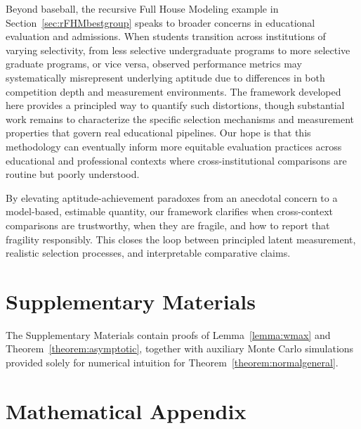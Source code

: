 \documentclass[12pt]{article}
\begin{document}
Beyond baseball, the recursive Full House Modeling example in Section~\ref{sec:rFHMbestgroup} speaks to broader concerns in educational evaluation and admissions. When students transition across institutions of varying selectivity, from less selective undergraduate programs to more selective graduate programs, or vice versa, observed performance metrics may systematically misrepresent underlying aptitude due to differences in both competition depth and measurement environments. The framework developed here provides a principled way to quantify such distortions, though substantial work remains to characterize the specific selection mechanisms and measurement properties that govern real educational pipelines. Our hope is that this methodology can eventually inform more equitable evaluation practices across educational and professional contexts where cross-institutional comparisons are routine but poorly understood.

By elevating aptitude-achievement paradoxes from an anecdotal concern to a model-based, estimable quantity, our framework clarifies when cross-context comparisons are trustworthy, when they are fragile, and how to report that fragility responsibly. This closes the loop between principled latent measurement, realistic selection processes, and interpretable comparative claims.




\section*{Supplementary Materials}

The Supplementary Materials contain proofs of Lemma~\ref{lemma:wmax} and Theorem~\ref{theorem:asymptotic}, together with auxiliary Monte Carlo simulations provided solely for numerical intuition for Theorem~\ref{theorem:normalgeneral}.



\section*{Mathematical Appendix}
\end{document}

